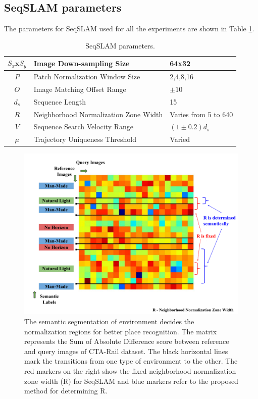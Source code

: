 \documentclass[letterpaper, 10 pt, conference]{ieeeconf}  %
\begin{document}
\subsection{SeqSLAM parameters}
The parameters for SeqSLAM used for all the experiments are shown in Table \ref{table:seqSLAMParams}.

\begin{table}[!h]
	\caption{SeqSLAM parameters.}
	\begin{tabular}{|c|p{4cm}|p{2.5cm}|}
		\hline
		$S_x\mathbf{x}S_y$ & Image Down-sampling Size & 64x32 \\
		\hline
		$P$ & Patch Normalization Window Size & {2,4,8,16} \\
		\hline
		$O$ & Image Matching Offset Range & $\pm10$ \\
		\hline
		$d_s$ & Sequence Length & 15 \\
		\hline
		$R$ & Neighborhood Normalization Zone Width & Varies from 5 to 640 \\
		\hline
		$V$ & Sequence Search Velocity Range & $(1\pm0.2)d_s$ \\
		\hline
		$\mu$ & Trajectory Uniqueness Threshold & Varied \\
		\hline
	\end{tabular}
	\label{table:seqSLAMParams}
\end{table}

\begin{figure}
 \includegraphics[scale=0.25]{SADmat-NormalisationMethod}
 \caption{The semantic segmentation of environment decides the normalization regions for better place recognition. The matrix represents the Sum of Absolute Difference score between reference and query images of CTA-Rail dataset. The black horizontal lines mark the transitions from one type of environment to the other. The red markers on the right show the fixed neighborhood normalization zone width (R) for SeqSLAM and blue markers refer to the proposed method for determining R.}
 \label{fig:SADmatRdisplay}
\end{figure}
\end{document}
